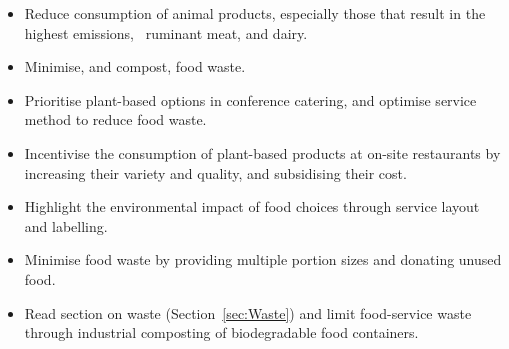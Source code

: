 \documentclass[../SustainableHEP.tex]{subfiles}
\begin{document}
\newpage
\begin{reco2}{\currentname}
{
\begin{itemize}[leftmargin=6 mm]
\item Reduce consumption of animal products, especially those that result in the highest emissions, \eg\ ruminant meat, and dairy.

\item Minimise, and compost, food waste.
\end{itemize}
}
{
\begin{itemize}[leftmargin=6 mm]
\item Prioritise plant-based options in conference catering, and optimise service method to reduce food waste.
\end{itemize}
}
{
\begin{itemize}[leftmargin=6 mm]
\item Incentivise the consumption of plant-based products at on-site restaurants by increasing their variety and quality,  and subsidising their cost.

\item Highlight the environmental impact of food choices through service layout and labelling.

\item Minimise food waste by providing multiple portion sizes and donating unused food.

\item Read section on waste (Section~\ref{sec:Waste}) and limit food-service waste \eg through industrial composting of biodegradable food containers.
\end{itemize}
}
\end{reco2}
\end{document}
